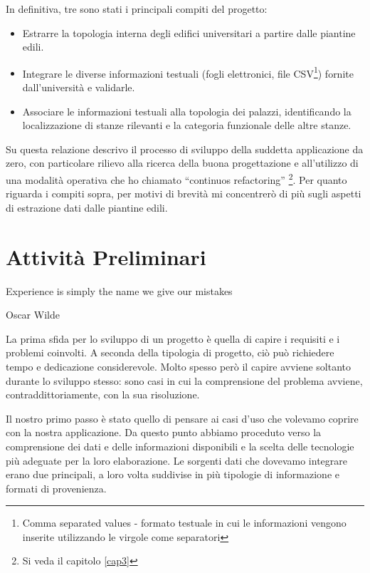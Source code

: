 \documentclass[12pt]{report}
\begin{document}
In definitiva, tre sono stati i principali compiti del progetto:
\begin{itemize}
  \item Estrarre la topologia interna degli edifici universitari a partire dalle piantine edili.
  \item Integrare le diverse informazioni testuali (fogli elettronici, file CSV\footnote{Comma separated values - formato testuale in cui le informazioni vengono inserite utilizzando le virgole come separatori}) fornite dall'università e validarle.
  \item Associare le informazioni testuali alla topologia dei palazzi, identificando la localizzazione di stanze rilevanti e la categoria funzionale delle altre stanze.
\end{itemize}

Su questa relazione descrivo il processo di sviluppo della suddetta applicazione da zero, con particolare rilievo alla ricerca della buona progettazione e all'utilizzo di una modalità operativa che ho chiamato “continuos refactoring” \footnote{Si veda il capitolo \ref{cap3}}. Per quanto riguarda i compiti sopra, per motivi di brevità mi concentrerò di più sugli aspetti di estrazione dati dalle piantine edili.

% 
% 
\chapter{Attività Preliminari}
\label{cap2}

\epigraph{Experience is simply the name we give our mistakes}{Oscar Wilde}



La prima sfida per lo sviluppo di un progetto è quella di capire i requisiti e i problemi coinvolti. A seconda della tipologia di progetto, ciò può richiedere tempo e dedicazione considerevole. Molto spesso però il capire avviene soltanto durante lo sviluppo stesso: sono casi in cui la comprensione del problema avviene, contraddittoriamente, con la sua risoluzione.

Il nostro primo passo è stato quello di pensare ai casi d'uso che volevamo coprire con la nostra applicazione. Da questo punto abbiamo proceduto verso la comprensione dei dati e delle informazioni disponibili e la scelta delle tecnologie più adeguate per la loro elaborazione. Le sorgenti dati che dovevamo integrare erano due principali, a loro volta suddivise in più tipologie di informazione e formati di provenienza.
\end{document}
